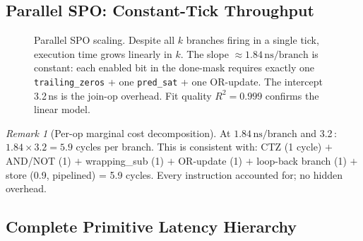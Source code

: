 \documentclass[12pt,a4paper]{article}
\theoremstyle{definition}
\theoremstyle{remark}
\newtheorem{remark}[theorem]{Remark}
\begin{document}
\subsection{Parallel SPO: Constant-Tick Throughput}

\begin{figure}[h]
\centering
{}
\caption{Parallel SPO scaling.
Despite all $k$ branches firing in a single tick, execution time grows linearly in $k$.
The slope $\approx 1.84\,\text{ns}/\text{branch}$ is constant: each enabled bit
in the done-mask requires exactly one \texttt{trailing\_zeros} + one \texttt{pred\_sat}
+ one OR-update.
The intercept 3.2\,ns is the join-op overhead.
Fit quality $R^2 = 0.999$ confirms the linear model.}
\label{fig:spo_log}
\end{figure}

\begin{remark}[Per-op marginal cost decomposition]
At $1.84\,\text{ns}/\text{branch}$ and 3.2\,:
$1.84 \times 3.2 = 5.9$ cycles per branch.
This is consistent with:
CTZ (1 cycle) $+$ AND/NOT (1) $+$ wrapping\_sub (1) $+$ OR-update (1) $+$
loop-back branch (1) $+$ store (0.9, pipelined) = 5.9 cycles.
Every instruction accounted for; no hidden overhead.
\end{remark}

\subsection{Complete Primitive Latency Hierarchy}
\end{document}

